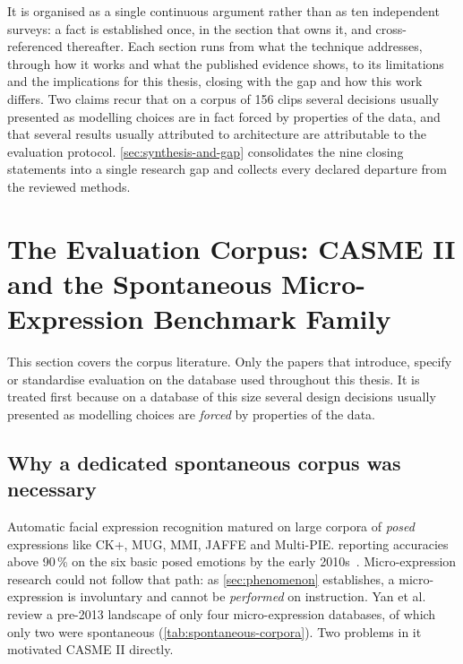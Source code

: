 It is organised as a single continuous argument rather than as ten independent surveys: a fact is established once, in the section that owns it, and cross-referenced thereafter. Each section runs from what the technique addresses, through how it works and what the published evidence shows, to its limitations and the implications for this thesis, closing with the gap and how this work differs. Two claims recur that on a corpus of 156 clips several decisions usually presented as modelling choices are in fact forced by properties of the data, and that several results usually attributed to architecture are attributable to the evaluation protocol. \autoref{sec:synthesis-and-gap} consolidates the nine closing statements into a single research gap and collects every declared departure from the reviewed methods.


\section{The Evaluation Corpus: CASME II and the Spontaneous Micro-Expression Benchmark Family}
\label{sec:corpus}

This section covers the corpus literature. Only the papers that introduce, specify or standardise evaluation on the database used throughout this thesis. It is treated first because on a database of this size several design decisions usually presented as modelling choices are \textit{forced} by properties of the data.

\subsection{Why a dedicated spontaneous corpus was necessary}
\label{sec:why-spontaneous}

Automatic facial expression recognition matured on large corpora of \textit{posed} expressions like CK+, MUG, MMI, JAFFE and Multi-PIE. reporting accuracies above 90\,\% on the six basic posed emotions by the early 2010s~\cite{yan2014}. Micro-expression research could not follow that path: as \autoref{sec:phenomenon} establishes, a micro-expression is involuntary and cannot be \textit{performed} on instruction. Yan et al.~\cite{yan2014} review a pre-2013 landscape of only four micro-expression databases, of which only two were spontaneous (\autoref{tab:spontaneous-corpora}). Two problems in it motivated CASME II directly.

